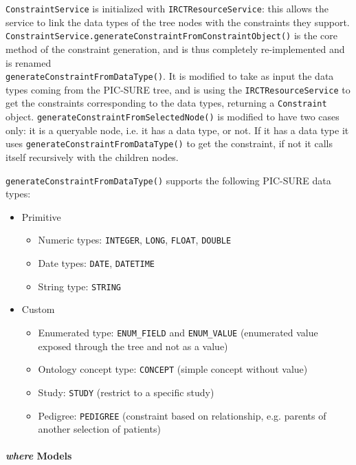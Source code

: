 \verb|ConstraintService| is initialized with \verb|IRCTResourceService|: this allows the service to link the data types of the tree nodes with the constraints they support. \\
\verb|ConstraintService.generateConstraintFromConstraintObject()| is the core method of the constraint generation, and is thus completely re-implemented and is renamed \\
\verb|generateConstraintFromDataType()|.
It is modified to take as input the data types coming from the PIC-SURE tree, and is using the \verb|IRCTResourceService| to get the constraints corresponding to the data types, returning a \verb|Constraint| object.
\verb|generateConstraintFromSelectedNode()| is modified to have two cases only: it is a queryable node, i.e. it has a data type, or not. If it has a data type it uses \verb|generateConstraintFromDataType()| to get the constraint, if not it calls itself recursively with the children nodes.

\verb|generateConstraintFromDataType()| supports the following PIC-SURE data types:
\begin{itemize}
\item Primitive
    \begin{itemize}
        \item Numeric types: \verb|INTEGER|, \verb|LONG|, \verb|FLOAT|, \verb|DOUBLE|
        \item Date types: \verb|DATE|, \verb|DATETIME|
        \item String type: \verb|STRING|
    \end{itemize}

\item Custom
    \begin{itemize}
        \item Enumerated type: \verb|ENUM_FIELD| and \verb|ENUM_VALUE| (enumerated value exposed through the tree and not as a value)
        \item Ontology concept type: \verb|CONCEPT| (simple concept without value)
        \item Study: \verb|STUDY| (restrict to a specific study)
        \item Pedigree: \verb|PEDIGREE| (constraint based on relationship, e.g. parents of another selection of patients)
    \end{itemize}
\end{itemize}


\paragraph{\emph{where} Models}

